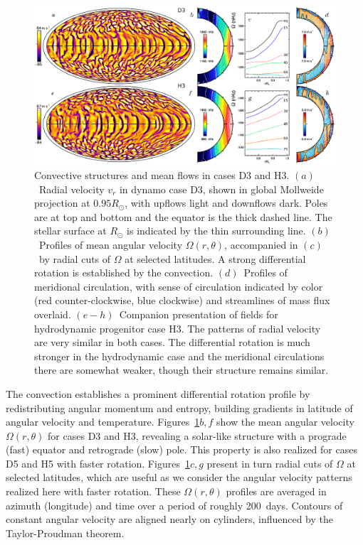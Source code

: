 \begin{figure}[!t]
  \vskip0.2cm
  \begin{center}
    \includegraphics[width=\linewidth]{figs/chapter_5/Figure_1/Figure_1.eps}
  \end{center}
  \caption[Convective structures and mean flows in cases D3 and H3]
	  {Convective structures and mean flows in cases D3 and H3. 
	    $(a)$~Radial velocity $v_r$ in dynamo case D3, shown in global Mollweide projection at
  $0.95R_\odot$, with upflows light and downflows dark.  Poles are at
  top and bottom and the equator is the thick dashed line.  The
  stellar surface at $R_\odot$ is indicated by the thin surrounding
  line.  $(b)$~Profiles of mean angular velocity $\Omega(r,\theta)$,
  accompanied in $(c)$~by radial cuts of $\Omega$ at selected
  latitudes.  A strong differential rotation is established by the
  convection. $(d)$~Profiles of meridional circulation, with sense of
  circulation indicated by color (red counter-clockwise, blue
  clockwise) and streamlines of mass flux overlaid.  
  $(e-h)$~Companion presentation of fields for hydrodynamic progenitor case H3.  The patterns of radial
  velocity are very similar in both cases.  The differential rotation
  is much stronger in the hydrodynamic case and the meridional
  circulations there are somewhat weaker, though their structure
  remains similar.
  \label{fig:case_D3_patterns}}
\end{figure}

\clearpage
The convection establishes a prominent differential rotation profile by
redistributing angular momentum and entropy, building gradients
in latitude of angular velocity and temperature.  
Figures~\ref{fig:case_D3_patterns}$b,f$ show the mean angular velocity
$\Omega(r,\theta)$ for cases D3 and H3, revealing a solar-like
structure with a prograde (fast) equator and retrograde (slow) pole.
This property is also realized for cases D5 and H5 with faster
rotation.  Figures~\ref{fig:case_D3_patterns}$c,g$ present in turn radial
cuts of $\Omega$ at selected latitudes, which are useful as we consider
the angular velocity patterns realized here with faster rotation. 
These $\Omega(r,\theta)$ profiles are averaged in azimuth (longitude)
and time over a period of roughly 200~days. 
Contours of constant angular velocity are aligned nearly
on cylinders, influenced by the Taylor-Proudman theorem.  

